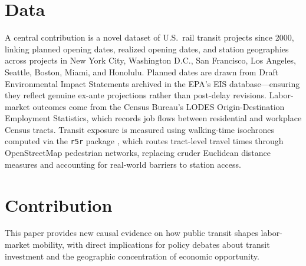 \documentclass[12pt]{article}
\begin{document}
\section{Data}
 
A central contribution is a novel dataset of U.S.\ rail transit projects since 2000, linking planned opening dates, realized opening dates, and station geographies across projects in New York City, Washington D.C., San Francisco, Los Angeles, Seattle, Boston, Miami, and Honolulu. Planned dates are drawn from Draft Environmental Impact Statements archived in the EPA's EIS database---ensuring they reflect genuine ex-ante projections rather than post-delay revisions. Labor-market outcomes come from the Census Bureau's LODES Origin-Destination Employment Statistics, which records job flows between residential and workplace Census tracts. Transit exposure is measured using walking-time isochrones computed via the \texttt{r5r} package \parencite{r5r}, which routes tract-level travel times through OpenStreetMap pedestrian networks, replacing cruder Euclidean distance measures and accounting for real-world barriers to station access.
 
\section{Contribution}
 
This paper provides new causal evidence on how public transit shapes labor-market mobility, with direct implications for policy debates about transit investment and the geographic concentration of economic opportunity.
 \newpage
\printbibliography
 
\end{document}

